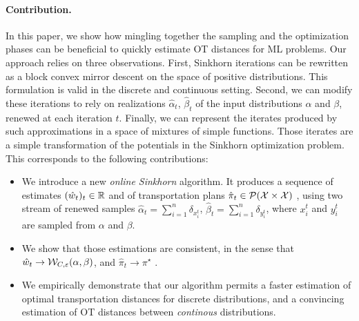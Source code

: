 

\paragraph{Contribution.}

In this paper, we show how mingling together the sampling and the optimization phases can be beneficial
to quickly estimate OT distances for ML problems.  
%
Our approach relies on three observations. First,
Sinkhorn iterations can be rewritten as a block convex mirror descent on the
space of positive distributions. This formulation is valid in the discrete and
continuous setting. Second, we can modify these iterations to rely on
realizations $\hat \alpha_t$, $\hat \beta_t$ of the input distributions $\alpha$
and $\beta$, renewed at each iteration $t$. Finally, we can represent the
iterates produced by such approximations in a space of mixtures of simple
functions. Those iterates are a simple transformation of the potentials in the
Sinkhorn optimization problem.
%
This corresponds to the following contributions:
\begin{itemize}
    \item We introduce a new \textit{online Sinkhorn} algorithm. It produces a sequence of
    estimates $(\hat w_t)_t \in \mathbb{R}$ and of transportation plans $\hat \pi_t \in
    \mathcal{P}(\mathcal{X} \times \mathcal{X})$ , using two stream of renewed samples $\hat \alpha_t =
    \sum_{i=1}^n \delta_{x^t_i}$, $\hat \beta_t = \sum_{i=1}^n \delta_{y^t_i}$,
    where $x^t_i$ and $y^t_i$ are sampled from $\alpha$ and $\beta$.
    \item We show that those estimations are consistent, in the sense that $\hat
    w_t \to \mathcal{W}_{C,\varepsilon}(\alpha, \beta)$, and $\hat \pi_t \to \pi^\star$ .
    \item We empirically demonstrate that our algorithm permits a faster
    estimation of optimal transportation distances for discrete distributions,
    and a convincing estimation of OT distances between \textit{continous} distributions.
\end{itemize}

